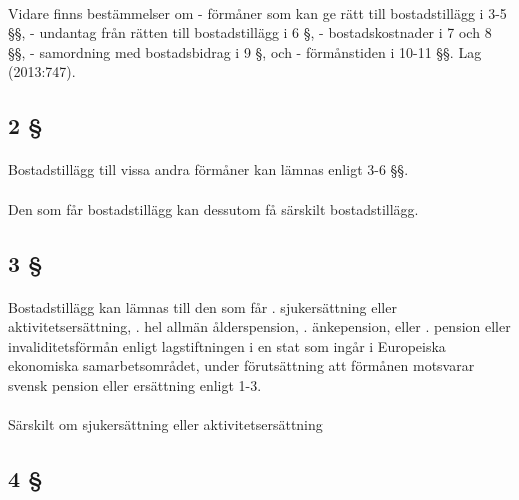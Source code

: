 \documentclass[a4paper,notitlepage,openany,10pt]{book}
\begin{document}
\paragraph*{}
Vidare finns bestämmelser om
\newline - förmåner som kan ge rätt till bostadstillägg i 3-5 §§,
\newline - undantag från rätten till bostadstillägg i 6 §,
\newline - bostadskostnader i 7 och 8 §§,
\newline - samordning med bostadsbidrag i 9 §, och
\newline - förmånstiden i 10-11 §§.
Lag (2013:747).
\subsection*{2 §}
\paragraph*{}
Bostadstillägg till vissa andra förmåner kan lämnas enligt 3-6 §§.
\paragraph*{}
Den som får bostadstillägg kan dessutom få särskilt bostadstillägg.
\subsection*{3 §}
\paragraph*{}
Bostadstillägg kan lämnas till den som får
. sjukersättning eller aktivitetsersättning,
. hel allmän ålderspension,
. änkepension, eller
. pension eller invaliditetsförmån enligt lagstiftningen i en stat som ingår i Europeiska ekonomiska samarbetsområdet, under förutsättning att förmånen motsvarar svensk pension eller ersättning enligt 1-3.
\paragraph*{}
Särskilt om sjukersättning eller aktivitetsersättning
\subsection*{4 §}
\end{document}
